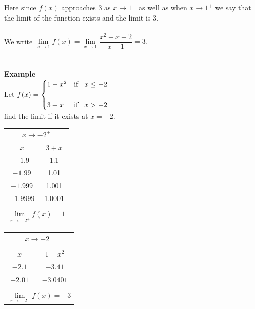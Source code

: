 \documentclass[11pt,a4paper]{article}
\begin{document}
Here since $f(x)$ approaches 3 as $x\longrightarrow 1^{-}$ as well as when $x\longrightarrow 1^+$ we say that the limit of the function exists and the limit is 3.\\\\
We write $\lim\limits_{x\longrightarrow 1}f(x)=\lim\limits_{x\longrightarrow 1} \dfrac{x^2+x-2}{x-1}=3$.\\\\\\








\textbf{Example}\\
Let $f(x)=
\begin{cases}
1-x^2 & \text{if}\hspace{0.3cm} x\leq -2\\\\
3+x & \text{if}\hspace{0.3cm} x>-2\\
\end{cases}
$\\


find the limit if it exists at $x=-2$.\\


\begin{table}[H]
\centering
\begin{tabular}{cc}
\multicolumn{2}{c}{$x\longrightarrow -2^+$}\\
$x$ & $3+x$\\
$-1.9$ & 1.1\\
$-1.99$ & 1.01\\
$-1.999$ & 1.001\\
$-1.9999$ & 1.0001\\\\
\multicolumn{2}{c}{ $\lim\limits_{x\longrightarrow -2^+}f(x)=1$}\\
\end{tabular}
\hspace{2.5cm}
\begin{tabular}{cc}
\multicolumn{2}{c}{$x\longrightarrow -2^-$}\\\\
$x$ & $1-x^2$\\
$-2.1$ & $-3.41$\\
$-2.01$ & $-3.0401$\\\\
\multicolumn{2}{c}{$\lim\limits_{x\longrightarrow -2^-} f(x)=-3$}\\
\end{tabular}
\end{table}
\end{document}
